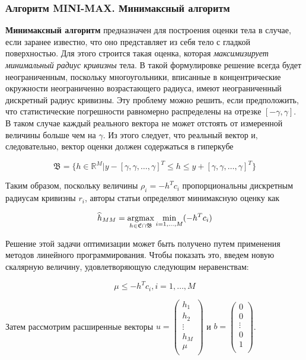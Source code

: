\documentclass[a4paper, 12pt, titlepage]{article}
\theoremstyle{definition}
\theoremstyle{plain}
\theoremstyle{plain}
\begin{document}
\subsubsection{Алгоритм MINI-MAX. Минимаксный алгоритм}
\label{sec:support-methods:2d-uniform:minimax}

\textbf{Минимаксный алгоритм} предназначен для построения
оценки тела в случае, если заранее известно, что оно представляет из себя тело
с гладкой поверхностью. Для этого строится такая оценка, которая
\textit{максимизирует минимальный радиус кривизны} тела. В такой формулировке
решение всегда будет неограниченным, поскольку многоугольники, вписанные в
концентрические окружности неограниченно возрастающего радиуса, имеют
неограниченный дискретный радиус кривизны. Эту проблему можно решить, если
предположить, что статистические погрешности равномерно распределены на отрезке
$[ - \gamma, \gamma]$. В таком случае каждый реального вектора не может
отстоять от измеренной величины больше чем на $\gamma$. Из этого следует, что
реальный вектор и, следовательно, вектор оценки должен содержаться в гиперкубе

\begin{equation}
\mathfrak{B} = \{h \in \mathbb{R}^{M} |
y - [\gamma, \gamma, \ldots, \gamma]^{T} \leq h \leq
y + [\gamma, \gamma, \ldots, \gamma]^{T}\}
\end{equation}

Таким образом, поскольку величины $\rho_{i} = - h^{T} c_{i}$ пропорциональны
дискретным радиусам кривизны $r_{i}$, авторы статьи определяют минимаксную
оценку как

\begin{equation}
\widehat{h}_{MM} =
\operatornamewithlimits{argmax}_{h \in \mathfrak{C} \cap \mathfrak{B}}
\min_{i = 1, \ldots, M} ( - h^{T} c_{i})
\end{equation}

Решение этой задачи оптимизации может быть получено путем применения методов
линейного программирования. Чтобы показать это, введем новую скалярную величину,
удовлетворяющую следующим неравенствам:

\begin{equation}
\mu \leq - h^{T} c_{i}, i = 1, \ldots, M
\end{equation}

Затем рассмотрим расширенные векторы
$u = \left(
\begin{array}{c}
 h_{1} \\
 h_{2} \\
 \vdots \\
 h_{M} \\
 \mu \\
\end{array}
\right)$ и
$ b = \left(\begin{array}{c}
 0 \\
 0 \\
 \vdots \\
 0 \\
 1 \\
\end{array}
\right)$.
\end{document}
